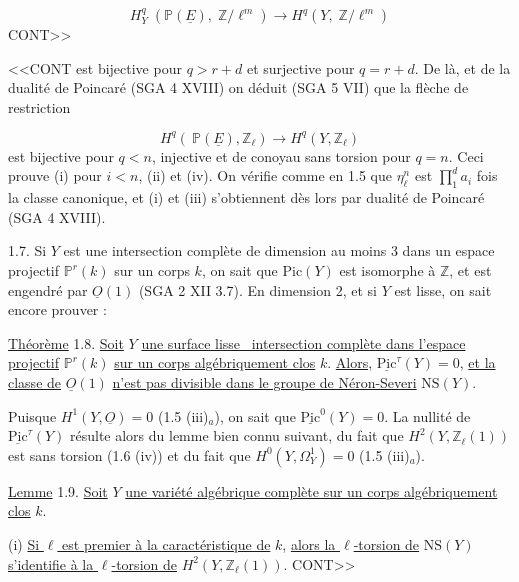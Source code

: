 \begin{equation*}
H^q_Y \; (\mathbb{P}(\underline{E}), \; \mathbb{Z}/\ell^m) \longrightarrow H^q(Y, \; \mathbb{Z}/\ell^m)
\end{equation*}
CONT>>



<<CONT est bijective pour $q > r + d$ et surjective pour $q = r + d$. De là, et de la dualité de Poincaré (SGA 4 XVIII) on déduit (SGA 5 VII) que la flèche de restriction

\begin{equation*}
H^q(\ \mathbb{P}(\underline{E}), \mathbb{Z}_\ell) \longrightarrow H^q(Y, \mathbb{Z}_\ell)
\end{equation*}
est bijective pour $q < n$, injective et de conoyau sans torsion pour $q = n$. Ceci prouve (i) pour $i < n$, (ii) et (iv). On vérifie comme en 1.5 que $\eta_\ell^n$ est $\prod_1^d a_i$ fois la classe canonique, et (i) et (iii) s'obtiennent dès lors par dualité de Poincaré (SGA 4 XVIII).

1.7. Si $Y$ est une intersection complète de dimension au moins 3 dans un espace projectif $\mathbb{P}^r(k)$ sur un corps $k$, on sait que $\mathrm{Pic}(Y)$ est isomorphe à $\mathbb{Z}$, et est engendré par $\underline{O}(1)$ (SGA 2 XII 3.7). En dimension 2, et si $Y$ est lisse, on sait encore prouver :

\underline{Théorème} 1.8. \underline{Soit} $Y$ \underline{une surface lisse \ intersection complète dans l'espace projectif} $\mathbb{P}^r(k)$ \underline{sur un corps algébriquement clos} $k$. \underline{Alors,} $\underline{\mathrm{Pic}}^\tau(Y) = 0$, \underline{et la classe de} $\underline{O}(1)$ \underline{n'est pas divisible dans le groupe de Néron-Severi} $\mathrm{NS}(Y)$.

Puisque $H^1(Y,\underline{O}) = 0$ (1.5 (iii)$_a$), on sait que $\underline{\mathrm{Pic}}^0(Y) = 0$. La nullité de $\underline{\mathrm{Pic}}^\tau(Y)$ résulte alors du lemme bien connu suivant, du fait que $H^2(Y, \mathbb{Z}_\ell(1))$ est sans torsion (1.6 (iv)) et du fait que $H^0(Y,\Omega^1_Y) = 0$ (1.5 (iii)$_a$).

\underline{Lemme} 1.9. \underline{Soit} $Y$ \underline{une variété algébrique complète sur un corps algébriquement clos} $k$.

(i) \underline{Si $\ell$ est premier à la caractéristique de} $k$, \underline{alors la $\ell$-torsion de} $\mathrm{NS}(Y)$ \underline{s'identifie à la $\ell$-torsion de} $H^2(Y, \mathbb{Z}_\ell(1))$. CONT>>



